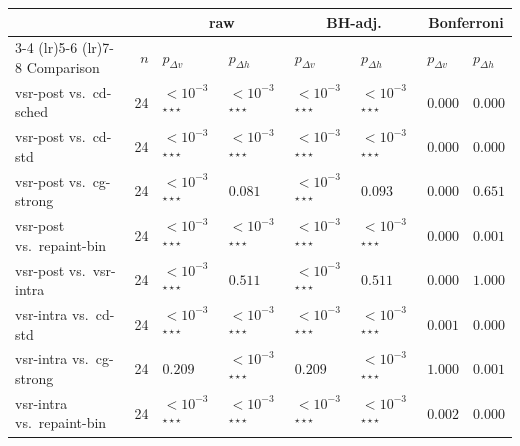 \begin{tabular}{lr|ll|ll|ll}
\toprule
 & & \multicolumn{2}{c|}{raw} & \multicolumn{2}{c|}{BH-adj.} & \multicolumn{2}{c}{Bonferroni} \\
\cmidrule(lr){3-4} \cmidrule(lr){5-6} \cmidrule(lr){7-8}
Comparison & $n$ & $p_{\Delta v}$ & $p_{\Delta h}$ & $p_{\Delta v}$ & $p_{\Delta h}$ & $p_{\Delta v}$ & $p_{\Delta h}$ \\
\midrule
vsr-post vs.\ cd-sched & 24 & $<\!10^{-3}$\,$^{\star\star\star}$ & $<\!10^{-3}$\,$^{\star\star\star}$ & $<\!10^{-3}$\,$^{\star\star\star}$ & $<\!10^{-3}$\,$^{\star\star\star}$ & $0.000$ & $0.000$ \\
vsr-post vs.\ cd-std & 24 & $<\!10^{-3}$\,$^{\star\star\star}$ & $<\!10^{-3}$\,$^{\star\star\star}$ & $<\!10^{-3}$\,$^{\star\star\star}$ & $<\!10^{-3}$\,$^{\star\star\star}$ & $0.000$ & $0.000$ \\
vsr-post vs.\ cg-strong & 24 & $<\!10^{-3}$\,$^{\star\star\star}$ & $0.081$ & $<\!10^{-3}$\,$^{\star\star\star}$ & $0.093$ & $0.000$ & $0.651$ \\
vsr-post vs.\ repaint-bin & 24 & $<\!10^{-3}$\,$^{\star\star\star}$ & $<\!10^{-3}$\,$^{\star\star\star}$ & $<\!10^{-3}$\,$^{\star\star\star}$ & $<\!10^{-3}$\,$^{\star\star\star}$ & $0.000$ & $0.001$ \\
vsr-post vs.\ vsr-intra & 24 & $<\!10^{-3}$\,$^{\star\star\star}$ & $0.511$ & $<\!10^{-3}$\,$^{\star\star\star}$ & $0.511$ & $0.000$ & $1.000$ \\
vsr-intra vs.\ cd-std & 24 & $<\!10^{-3}$\,$^{\star\star\star}$ & $<\!10^{-3}$\,$^{\star\star\star}$ & $<\!10^{-3}$\,$^{\star\star\star}$ & $<\!10^{-3}$\,$^{\star\star\star}$ & $0.001$ & $0.000$ \\
vsr-intra vs.\ cg-strong & 24 & $0.209$ & $<\!10^{-3}$\,$^{\star\star\star}$ & $0.209$ & $<\!10^{-3}$\,$^{\star\star\star}$ & $1.000$ & $0.001$ \\
vsr-intra vs.\ repaint-bin & 24 & $<\!10^{-3}$\,$^{\star\star\star}$ & $<\!10^{-3}$\,$^{\star\star\star}$ & $<\!10^{-3}$\,$^{\star\star\star}$ & $<\!10^{-3}$\,$^{\star\star\star}$ & $0.002$ & $0.000$ \\
\bottomrule
\end{tabular}
